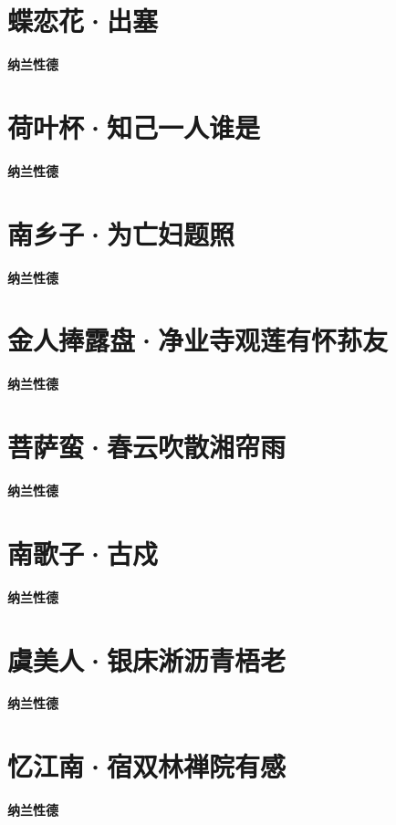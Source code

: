 \documentclass[12pt,a4paper]{ctexbook}
\begin{document}
\section{蝶恋花·出塞}
\textbf{纳兰性德}\par\vspace{0.5em}

\section{荷叶杯·知己一人谁是}
\textbf{纳兰性德}\par\vspace{0.5em}

\section{南乡子·为亡妇题照}
\textbf{纳兰性德}\par\vspace{0.5em}

\section{金人捧露盘·净业寺观莲有怀荪友}
\textbf{纳兰性德}\par\vspace{0.5em}

\section{菩萨蛮·春云吹散湘帘雨}
\textbf{纳兰性德}\par\vspace{0.5em}

\section{南歌子·古戍}
\textbf{纳兰性德}\par\vspace{0.5em}

\section{虞美人·银床淅沥青梧老}
\textbf{纳兰性德}\par\vspace{0.5em}

\section{忆江南·宿双林禅院有感}
\textbf{纳兰性德}\par\vspace{0.5em}
\end{document}
